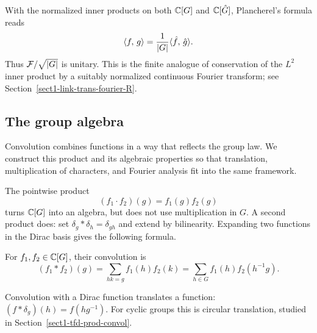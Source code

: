 
\begin{rem}[Normalization]
With the normalized inner products on both $\mathbb{C}[G]$ and $\mathbb{C}[\hat{G}]$,
Plancherel's formula reads
\[
 \langle f,\,g\rangle=\frac1{|G|}\langle \hat{f},\,\hat{g}\rangle.
\]
Thus $\mathcal{F}/\sqrt{|G|}$ is unitary. This is the finite analogue of conservation
of the $L^2$ inner product by a suitably normalized continuous Fourier
transform; see Section~\ref{sect1-link-trans-fourier-R}.
\end{rem}

\subsection{The group algebra}
\label{sect2-algebre-grpe-abelien}

Convolution combines functions in a way that reflects the group law. We
construct this product and its algebraic properties so that translation,
multiplication of characters, and Fourier analysis fit into the same
framework.

The pointwise product
\begin{equation}
\label{eq-defn-prod-term-term-functions}
 (f_1\cdot f_2)(g)=f_1(g)f_2(g)
\end{equation}
turns $\mathbb{C}[G]$ into an algebra, but does not use multiplication in $G$.
A second product does: set $\delta_g*\delta_h=\delta_{gh}$ and extend by
bilinearity. Expanding two functions in the Dirac basis gives the following
formula.

\begin{defn}[Convolution]
\label{notation-23}
For $f_1,f_2\in\mathbb{C}[G]$, their convolution is
\begin{equation}
\label{eq-formula-prod-convol-grpe-abelien}
 (f_1*f_2)(g)=\sum_{hk=g}f_1(h)f_2(k)
 =\sum_{h\in G}f_1(h)f_2(h^{-1}g).
\end{equation}
\end{defn}


\begin{rem}
Convolution with a Dirac function translates a function:
$(f*\delta_g)(h)=f(hg^{-1})$.
For cyclic groups this is circular translation, studied in
Section~\ref{sect1-tfd-prod-convol}.
\end{rem}

